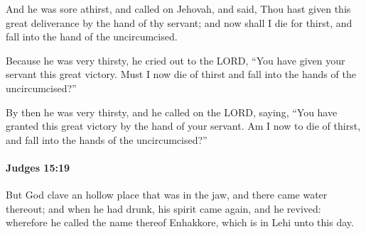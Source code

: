 			\begin{versebox}
					\item[BHS] 
					\item[ASV] And he was sore athirst, and called on Jehovah, and said, Thou hast given this great deliverance by the hand of thy servant; and now shall I die for thirst, and fall into the hand of the uncircumcised.
					\item[NIV] Because he was very thirsty, he cried out to the LORD, “You have given your servant this great victory. Must I now die of thirst and fall into the hands of the uncircumcised?”
					\item[NRSV] By then he was very thirsty, and he called on the LORD, saying, “You have granted this great victory by the hand of your servant. Am I now to die of thirst, and fall into the hands of the uncircumcised?”
			\end{versebox}

		\paragraph{Judges 15:19} %
			\label{JUDGES-15-19}

			But God clave an hollow place that was in the jaw, and there came water thereout; and when he had drunk, his spirit came again, and he revived: wherefore he called the name thereof Enhakkore, which is in Lehi unto this day.

